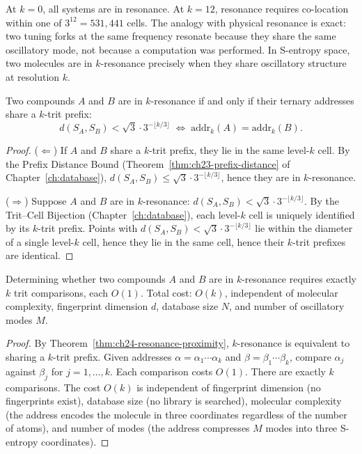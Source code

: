 At $k = 0$, all systems are in resonance.  At $k = 12$, resonance requires
co-location within one of $3^{12} = 531{,}441$ cells.  The analogy with
physical resonance is exact: two tuning forks at the same frequency resonate
because they share the same oscillatory mode, not because a computation was
performed.  In S-entropy space, two molecules are in $k$-resonance precisely
when they share oscillatory structure at resolution $k$.

\begin{theorem}
\label{thm:ch24-resonance-proximity}
Two compounds $A$ and $B$ are in $k$-resonance if and only if their ternary
addresses share a $k$-trit prefix:
\begin{equation}
\label{eq:ch24-rpe}
  d(S_A, S_B) < \sqrt{3} \cdot 3^{-\lfloor k/3 \rfloor}
  \;\iff\;
  \mathrm{addr}_k(A) = \mathrm{addr}_k(B).
\end{equation}
\end{theorem}

\begin{proof}
($\Leftarrow$) If $A$ and $B$ share a $k$-trit prefix, they lie in the same
level-$k$ cell.  By the Prefix Distance Bound (Theorem~\ref{thm:ch23-prefix-distance}
of Chapter~\ref{ch:database}), $d(S_A, S_B) \leq \sqrt{3} \cdot 3^{-\lfloor
k/3 \rfloor}$, hence they are in $k$-resonance.

($\Rightarrow$) Suppose $A$ and $B$ are in $k$-resonance: $d(S_A, S_B) <
\sqrt{3} \cdot 3^{-\lfloor k/3 \rfloor}$.  By the Trit--Cell Bijection
(Chapter~\ref{ch:database}), each level-$k$ cell is uniquely identified by its
$k$-trit prefix.  Points with $d(S_A, S_B) < \sqrt{3} \cdot 3^{-\lfloor k/3
\rfloor}$ lie within the diameter of a single level-$k$ cell, hence they lie
in the same cell, hence their $k$-trit prefixes are identical.
\end{proof}

\begin{theorem}
\label{thm:ch24-no-computation}
Determining whether two compounds $A$ and $B$ are in $k$-resonance requires
exactly $k$ trit comparisons, each $O(1)$.  Total cost: $O(k)$, independent
of molecular complexity, fingerprint dimension $d$, database size $N$, and
number of oscillatory modes $M$.
\end{theorem}

\begin{proof}
By Theorem~\ref{thm:ch24-resonance-proximity}, $k$-resonance is equivalent to
sharing a $k$-trit prefix.  Given addresses $\alpha = \alpha_1 \cdots \alpha_k$
and $\beta = \beta_1 \cdots \beta_k$, compare $\alpha_j$ against $\beta_j$ for
$j = 1, \ldots, k$.  Each comparison costs $O(1)$.  There are exactly $k$
comparisons.  The cost $O(k)$ is independent of fingerprint dimension (no
fingerprints exist), database size (no library is searched), molecular
complexity (the address encodes the molecule in three coordinates regardless
of the number of atoms), and number of modes (the address compresses $M$ modes
into three S-entropy coordinates).
\end{proof}

